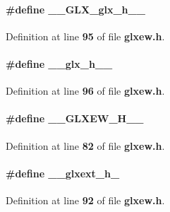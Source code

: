 \paragraph[{\+\_\+\+\_\+\+G\+L\+X\+\_\+glx\+\_\+h\+\_\+\+\_\+}]{\setlength{\rightskip}{0pt plus 5cm}\#define \+\_\+\+\_\+\+G\+L\+X\+\_\+glx\+\_\+h\+\_\+\+\_\+}\label{glxew_8h_ae8aeaa34bab5d54e3ad9c60c71250699}


Definition at line {\bf 95} of file {\bf glxew.\+h}.

\paragraph[{\+\_\+\+\_\+glx\+\_\+h\+\_\+\+\_\+}]{\setlength{\rightskip}{0pt plus 5cm}\#define \+\_\+\+\_\+glx\+\_\+h\+\_\+\+\_\+}\label{glxew_8h_a2b2b0b7077692e0806e9081087712a0e}


Definition at line {\bf 96} of file {\bf glxew.\+h}.

\paragraph[{\+\_\+\+\_\+\+G\+L\+X\+E\+W\+\_\+\+H\+\_\+\+\_\+}]{\setlength{\rightskip}{0pt plus 5cm}\#define \+\_\+\+\_\+\+G\+L\+X\+E\+W\+\_\+\+H\+\_\+\+\_\+}\label{glxew_8h_aa7125c3f5052f02624a3a036fffd6dd4}


Definition at line {\bf 82} of file {\bf glxew.\+h}.

\paragraph[{\+\_\+\+\_\+glxext\+\_\+h\+\_\+}]{\setlength{\rightskip}{0pt plus 5cm}\#define \+\_\+\+\_\+glxext\+\_\+h\+\_\+}\label{glxew_8h_a208c385335a6f63b1cf4246b0813ded3}


Definition at line {\bf 92} of file {\bf glxew.\+h}.

